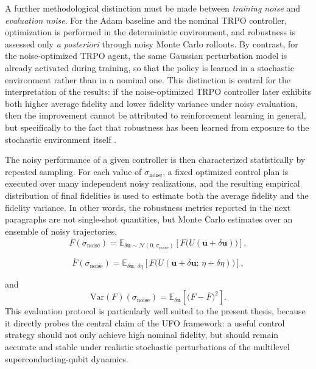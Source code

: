 A further methodological distinction must be made between \emph{training noise} and \emph{evaluation noise}. For the Adam baseline and the nominal TRPO controller, optimization is performed in the deterministic environment, and robustness is assessed only \emph{a posteriori} through noisy Monte Carlo rollouts. By contrast, for the noise-optimized TRPO agent, the same Gaussian perturbation model is already activated during training, so that the policy is learned in a stochastic environment rather than in a nominal one. This distinction is central for the interpretation of the results: if the noise-optimized TRPO controller later exhibits both higher average fidelity and lower fidelity variance under noisy evaluation, then the improvement cannot be attributed to reinforcement learning in general, but specifically to the fact that robustness has been learned from exposure to the stochastic environment itself \cite{Niu2019}.

The noisy performance of a given controller is then characterized statistically by repeated sampling. For each value of \(\sigma_{\mathrm{noise}}\), a fixed optimized control plan is executed over many independent noisy realizations, and the resulting empirical distribution of final fidelities is used to estimate both the average fidelity and the fidelity variance. In other words, the robustness metrics reported in the next paragraphs are not single-shot quantities, but Monte Carlo estimates over an ensemble of noisy trajectories,
\begin{equation}
\overline{F}(\sigma_{\mathrm{noise}})
=
\mathbb{E}_{\delta\bm{u}\sim\mathcal{N}(0,\sigma_{\mathrm{noise}})}
\left[
F\bigl(U(\bm{u}+\delta\bm{u})\bigr)
\right],
\label{eq:robustness_average_fidelity_section}
\end{equation}

\begin{equation}
\overline{F}(\sigma_{\mathrm{noise}})
=
\mathbb{E}_{\delta\bm{u},\,\delta\eta}
\left[
F\bigl(U(\bm{u}+\delta\bm{u};\,\eta+\delta\eta)\bigr)
\right],
\label{eq:robustness_average_fidelity_section_eta}
\end{equation}

and
\begin{equation}
\mathrm{Var}(F)(\sigma_{\mathrm{noise}})
=
\mathbb{E}_{\delta\bm{u}}
\left[
\bigl(F-\overline{F}\bigr)^2
\right].
\label{eq:robustness_fidelity_variance_section}
\end{equation}
This evaluation protocol is particularly well suited to the present thesis, because it directly probes the central claim of the UFO framework: a useful control strategy should not only achieve high nominal fidelity, but should remain accurate and stable under realistic stochastic perturbations of the multilevel superconducting-qubit dynamics.


